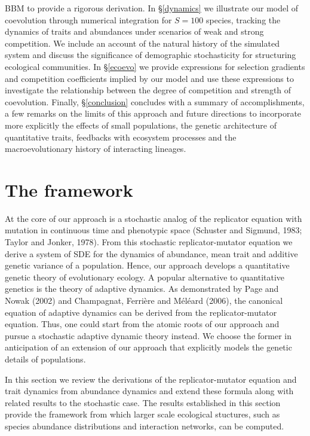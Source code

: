 \documentclass[]{elsarticle} %
\begin{document}
BBM to provide a rigorous derivation. In \S\ref{dynamics} we illustrate
our model of coevolution through numerical integration for \(S=100\)
species, tracking the dynamics of traits and abundances under scenarios
of weak and strong competition. We include an account of the natural
history of the simulated system and discuss the significance of
demographic stochasticity for structuring ecological communities. In
\S\ref{ecoevo} we provide expressions for selection gradients and
competition coefficients implied by our model and use these expressions
to investigate the relationship between the degree of competition and
strength of coevolution. Finally, \S\ref{conclusion} concludes with a
summary of accomplishments, a few remarks on the limits of this approach
and future directions to incorporate more explicitly the effects of
small populations, the genetic architecture of quantitative traits,
feedbacks with ecosystem processes and the macroevolutionary history of
interacting lineages.

\hypertarget{the-framework}{%
\section{The framework}\label{the-framework}}

At the core of our approach is a stochastic analog of the replicator
equation with mutation in continuous time and phenotypic space (Schuster
and Sigmund, 1983; Taylor and Jonker, 1978). From this stochastic
replicator-mutator equation we derive a system of SDE for the dynamics
of abundance, mean trait and additive genetic variance of a population.
Hence, our approach develops a quantitative genetic theory of
evolutionary ecology. A popular alternative to quantitative genetics is
the theory of adaptive dynamics. As demonstrated by Page and Nowak
(2002) and Champagnat, Ferrière and Méléard (2006), the canonical
equation of adaptive dynamics can be derived from the replicator-mutator
equation. Thus, one could start from the atomic roots of our approach
and pursue a stochastic adaptive dynamic theory instead. We choose the
former in anticipation of an extension of our approach that explicitly
models the genetic details of populations.

In this section we review the derivations of the replicator-mutator
equation and trait dynamics from abundance dynamics and extend these
formula along with related results to the stochastic case. The results
established in this section provide the framework from which larger
scale ecological stuctures, such as species abundance distributions and
interaction networks, can be computed.
\end{document}
